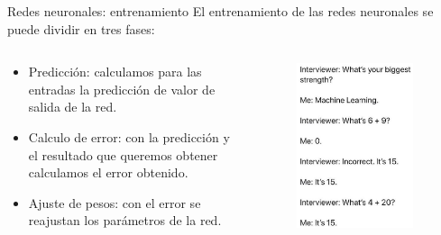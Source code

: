 \begin{frame}{Redes neuronales: entrenamiento}
El entrenamiento de las redes neuronales se puede dividir en tres fases: 
\begin{columns}[c]
\begin{column}{0.49\textwidth}
\begin{itemize}
    \item \alert{Predicción:} calculamos para las entradas la predicción de valor de salida de la red.
    \item \alert{Calculo de error:} con la predicción y el resultado que queremos obtener calculamos el error obtenido.
    \item \alert{Ajuste de pesos:} con el error se reajustan los parámetros de la red.
\end{itemize} 
\end{column}

\begin{column}{0.49\textwidth}
\begin{figure}
\centering
    \includegraphics[width=0.9\textwidth]{Slides/figures/Tema 3/jokeML.png}
\end{figure}
\end{column}
\end{columns}
\end{frame}

